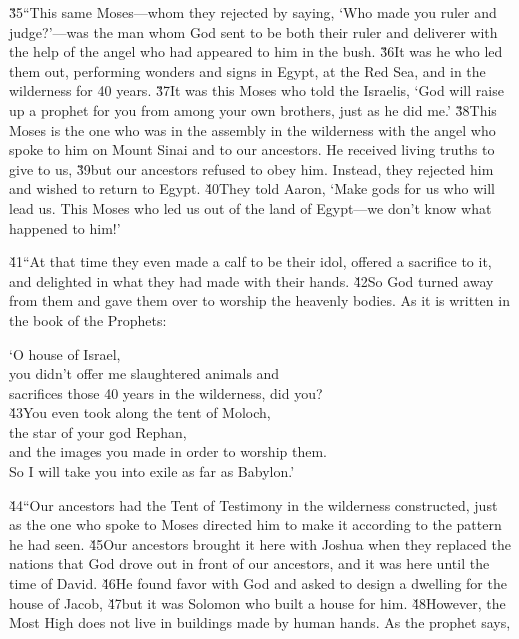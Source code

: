 \v{35}``This same Moses---whom they rejected by saying, `Who made you ruler and judge?'---was the man whom God sent to be both their ruler and deliverer with the help of the angel who had appeared to him in the bush. \v{36}It was he who led them out, performing wonders and signs in Egypt, at the Red Sea, and in the wilderness for 40 years. \v{37}It was this Moses who told the Israelis, `God will raise up a prophet for you from among your own brothers, just as he did me.' \v{38}This Moses is the one who was in the assembly in the wilderness with the angel who spoke to him on Mount Sinai and to our ancestors. He received living truths to give to us, \v{39}but our ancestors refused to obey him. Instead, they rejected him and wished to return to Egypt. \v{40}They told Aaron, `Make gods for us who will lead us. This Moses who led us out of the land of Egypt---we don't know what happened to him!'

\v{41}``At that time they even made a calf to be their idol, offered a sacrifice to it, and delighted in what they had made with their hands. \v{42}So God turned away from them and gave them over to worship the heavenly bodies. As it is written in the book of the Prophets:

\begin{poetry}
\poeml `O house of Israel, \\
\poemll    you didn't offer me slaughtered animals and \\
\poemlll       sacrifices those 40 years in the wilderness, did you? \\
\poeml \v{43}You even took along the tent of Moloch, \\
\poemll    the star of your god Rephan, \\
\poeml and the images you made in order to worship them. \\
\poemll    So I will take you into exile as far as Babylon.'
\end{poetry}

\v{44}``Our ancestors had the Tent of Testimony in the wilderness constructed, just as the one who spoke to Moses directed him to make it according to the pattern he had seen. \v{45}Our ancestors brought it here with Joshua when they replaced the nations that God drove out in front of our ancestors, and it was here until the time of David. \v{46}He found favor with God and asked to design a dwelling for the house of Jacob, \v{47}but it was Solomon who built a house for him. \v{48}However, the Most High does not live in buildings made by human hands. As the prophet says,

